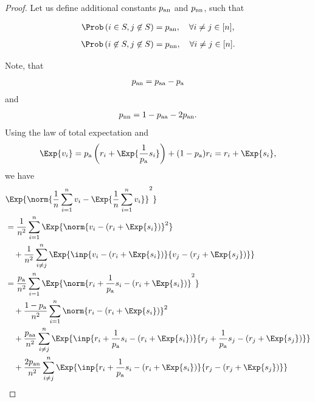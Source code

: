 \documentclass{article}
\newcommand*{\probavailable}{\ensuremath{p_{\textnormal{a}}}}
\newcommand*{\probpairaa}{\ensuremath{p_{\textnormal{aa}}}}
\newcommand*{\probpairan}{\ensuremath{p_{\textnormal{an}}}}
\newcommand*{\probpairnn}{\ensuremath{p_{\textnormal{nn}}}}
\begin{document}
\begin{proof}
  Let us define additional constants $\probpairan$ and $\probpairnn$, such that
  \begin{enumerate}
    \Item \begin{align*}\Prob\left(i \in S, j \not\in S\right) = \probpairan, \quad \forall i \neq j \in [n],\end{align*}
    \Item \begin{align*}\Prob\left(i \not\in S, j \not\in S\right) = \probpairnn, \quad \forall i \neq j \in [n].\end{align*}
  \end{enumerate}
  Note, that 
  \begin{align}
    \label{auxiliary_facts_partial_participation:one}
    \probpairan = \probpairaa - \probavailable
  \end{align}
  and 
  \begin{align}
    \label{auxiliary_facts_partial_participation:two}
    \probpairnn = 1 - \probpairaa - 2 \probpairan.
  \end{align}
  Using the law of total expectation and 
  \begin{align*}
    \Exp{v_i} = \probavailable \left(r_i + \Exp{\frac{1}{\probavailable} s_i}\right) + (1 - \probavailable) r_i = r_i + \Exp{s_i},
  \end{align*}
  we have
  \begin{align*}
    &\Exp{\norm{\frac{1}{n}\sum_{i=1}^n v_i - \Exp{\frac{1}{n}\sum_{i=1}^n v_i}}^2} \\
    &=\frac{1}{n^2}\sum_{i=1}^n\Exp{\norm{v_i - \left(r_i + \Exp{s_i}\right)}^2} \\
    &\quad +\frac{1}{n^2}\sum_{i\neq j}^n\Exp{\inp{v_i - \left(r_i + \Exp{s_i}\right)}{v_j - \left(r_j + \Exp{s_j}\right)}} \\
    &=\frac{\probavailable}{n^2}\sum_{i=1}^n\Exp{\norm{r_i + \frac{1}{\probavailable} s_i - \left(r_i + \Exp{s_i}\right)}^2} \\
    &\quad +\frac{1 - \probavailable}{n^2}\sum_{i=1}^n\norm{r_i - \left(r_i + \Exp{s_i}\right)}^2 \\
    &\quad +\frac{\probpairaa}{n^2}\sum_{i\neq j}^n\Exp{\inp{r_i + \frac{1}{\probavailable} s_i - \left(r_i + \Exp{s_i}\right)}{r_j + \frac{1}{\probavailable} s_j - \left(r_j + \Exp{s_j}\right)}} \\
    &\quad +\frac{2 \probpairan}{n^2}\sum_{i\neq j}^n\Exp{\inp{r_i + \frac{1}{\probavailable} s_i - \left(r_i + \Exp{s_i}\right)}{r_j - \left(r_j + \Exp{s_j}\right)}} \\

\end{align*}
\end{proof}
\end{document}
